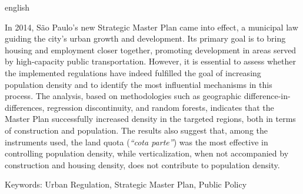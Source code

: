 \documentclass[
  a4paper, 
  12pt, 
  openany, 
  oneside, 
  brazil,
]{abntex2}
\begin{document}
\begin{resumo}[Abstract]
 \begin{otherlanguage*}{english}

  In 2014, São Paulo's new Strategic Master Plan came into effect, a municipal law guiding the city's urban growth and development. Its primary goal is to bring housing and employment closer together, promoting development in areas served by high-capacity public transportation. However, it is essential to assess whether the implemented regulations have indeed fulfilled the goal of increasing population density and to identify the most influential mechanisms in this process. The analysis, based on methodologies such as geographic difference-in-differences, regression discontinuity, and random forests, indicates that the Master Plan successfully increased density in the targeted regions, both in terms of construction and population. The results also suggest that, among the instruments used, the land quota (\textit{``cota parte''}) was the most effective in controlling population density, while verticalization, when not accompanied by construction and housing density, does not contribute to population density.

  Keywords: Urban Regulation, Strategic Master Plan, Public Policy

 \end{otherlanguage*}
\end{resumo}


\tableofcontents*
\cleardoublepage


\textual
\pagestyle{tccinsper} %



\postextual
 





% 
% 
%



% 



\end{document}
